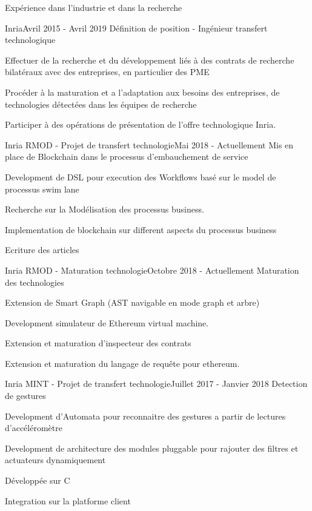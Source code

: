 \documentclass{resume} %
\begin{document}
\begin{rSection}{Exp\'{e}rience dans l'industrie et dans la recherche}

\begin{rSubsection}{Inria}{Avril 2015 - Avril 2019 }{D\'efinition de position - Ing\'{e}nieur transfert technologique}
		\item 
		\item Effectuer de la recherche et du d\'{e}veloppement li\'{e}s \`a des contrats de recherche bilat\'{e}raux avec des entreprises, en particulier des PME 
		\item Proc\'{e}der \`a la maturation et  a  l'adaptation aux besoins des entreprises, de technologies d\'{e}tect\'{e}es dans les \'{e}quipes de recherche 
		\item Participer  \`a  des op\'{e}rations de pr\'{e}sentation de l'offre technologique Inria. 
	\end{rSubsection}
	
	\begin{rSubsection}{Inria RMOD - Projet de transfert technologie}{Mai 2018 - Actuellement }{Mis en place de Blockchain dans le processus d'embauchement de service}
		\item 
		\item Development de DSL pour execution des Workflows bas\'{e} sur le model de processus swim lane
		\item Recherche sur la Mod\'{e}lisation des processus business. 
		\item Implementation de blockchain sur different aspects du processus business
		\item Ecriture des articles
	\end{rSubsection}

	\begin{rSubsection}{Inria RMOD - Maturation technologie}{Octobre 2018 - Actuellement }{Maturation des technologies}
		\item 
		\item Extension de Smart Graph (AST navigable en mode graph et arbre) 
		\item Development simulateur de Ethereum virtual machine. 
		\item Extension et maturation d'inspecteur des contrats 
		\item Extension et maturation du langage de requ\^{e}te pour ethereum. 
	\end{rSubsection}
	\begin{rSubsection}{Inria MINT - Projet de transfert technologie}{Juillet 2017 - Janvier 2018  }{Detection de gestures}
		\item 
		\item Development d'Automata pour reconnaitre des gestures a partir de lectures d'acc\'{e}l\'{e}rom\`{e}tre
		\item Development de architecture des modules pluggable pour rajouter des filtres et actuateurs dynamiquement  
		\item D\'{e}velopp\'{e}e sur C
		\item Integration sur la platforme client 
	\end{rSubsection}



\end{rSection}
\end{document}
